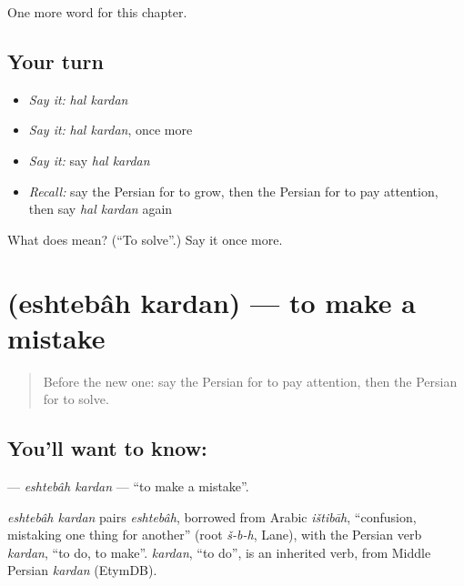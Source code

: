 \begin{grammarlens}[title={What you've built}]
One more word for this chapter.
\end{grammarlens}

\subsection*{Your turn}
\begin{itemize}
\raggedright
  \item \emph{Say it:} \emph{hal kardan}
  \item \emph{Say it:} \emph{hal kardan}, once more
  \item \emph{Say it:} say \emph{hal kardan}
  \item \emph{Recall:} say the Persian for to grow, then the Persian for to pay attention, then say \emph{hal kardan} again
\end{itemize}

\begin{tcolorbox}[breakable,colback=teal!4,colframe=teal!35!black,title={Before you move on}]
What does   mean? (\textquotedblleft{}To solve\textquotedblright{}.) Say it once more.
\end{tcolorbox}
\section[\texorpdfstring{\fa{اشتباه} \fa{کردن} (eshtebâh kardan)}{اشتباه کردن (eshtebâh kardan)}]{  (eshtebâh kardan) — to make a mistake}

\label{lesson:FA-C185-eshtebah-kardan}



\begin{quote}
Before the new one: say the Persian for to pay attention, then the Persian for to solve.
\end{quote}

\subsection*{You'll want to know:  }
\textbf{ } — \emph{eshtebâh kardan} — \textquotedblleft{}to make a mistake\textquotedblright{}.

\begin{cousinweb}
\emph{eshtebâh kardan} pairs \emph{eshtebâh}, borrowed from Arabic \emph{ištibāh}, \textquotedblleft{}confusion, mistaking one thing for another\textquotedblright{} (root \emph{š-b-h}, Lane), with the Persian verb \emph{kardan}, \textquotedblleft{}to do, to make\textquotedblright{}. \emph{kardan}, \textquotedblleft{}to do\textquotedblright{}, is an inherited verb, from Middle Persian \emph{kardan} (EtymDB).
\end{cousinweb}

